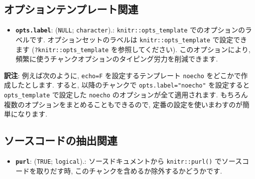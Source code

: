 \documentclass[
]{bxjsreport}
\newenvironment{Shaded}{\begin{snugshade}}{\end{snugshade}}
\newcommand{\AttributeTok}[1]{\textcolor[rgb]{0.77,0.63,0.00}{#1}}
\newcommand{\FunctionTok}[1]{\textcolor[rgb]{0.00,0.00,0.00}{#1}}
\newcommand{\NormalTok}[1]{#1}
\newcommand{\SpecialCharTok}[1]{\textcolor[rgb]{0.00,0.00,0.00}{#1}}
\providecommand{\tightlist}{%
  \setlength{\itemsep}{0pt}\setlength{\parskip}{0pt}}
\begin{document}
\hypertarget{ux30aaux30d7ux30b7ux30e7ux30f3ux30c6ux30f3ux30d7ux30ecux30fcux30c8ux95a2ux9023}{%
\subsection{オプションテンプレート関連}\label{ux30aaux30d7ux30b7ux30e7ux30f3ux30c6ux30f3ux30d7ux30ecux30fcux30c8ux95a2ux9023}}

\begin{itemize}
\tightlist
\item
  \textbf{\texttt{opts.label}}: (\texttt{NULL}; \texttt{character}).:
  \texttt{knitr::opts\_template} でのオプションのラベルです.
  オプションセットのラベルは \texttt{knitr::opts\_template}
  で設定できます (\texttt{?knitr::opts\_template} を参照してください).
  このオプションにより,
  頻繁に使うチャンクオプションのタイピング労力を削減できます.
\end{itemize}

\textbf{訳注}: 例えば次のように, \texttt{echo=F} を設定するテンプレート
\texttt{noecho} をどこかで作成したとします. すると, 以降のチャンクで
\texttt{opts.label="noecho"} を設定すると \texttt{opts\_template}
で設定した \texttt{noecho} のオプションが全て適用されます.
もちろん複数のオプションをまとめることもできるので,
定番の設定を使いまわすのが簡単になります.

\begin{Shaded}
\end{Shaded}

\hypertarget{ux30bdux30fcux30b9ux30b3ux30fcux30c9ux306eux62bdux51faux95a2ux9023}{%
\subsection{ソースコードの抽出関連}\label{ux30bdux30fcux30b9ux30b3ux30fcux30c9ux306eux62bdux51faux95a2ux9023}}

\begin{itemize}
\tightlist
\item
  \textbf{\texttt{purl}}: (\texttt{TRUE}; \texttt{logical}).:
  ソースドキュメントから \texttt{knitr::purl()}
  でソースコードを取りだす時,
  このチャンクを含めるか除外するかどうかです.
\end{itemize}
\end{document}

